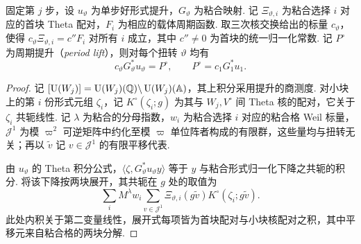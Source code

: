 \begin{lemma}[与扭转无关的周期提升]
\label{lem:c-period-adjoint}
\emitthmsource
固定第 $j$ 步，设 $u_\vartheta$ 为单步好形式提升，$G_\vartheta$ 为粘合映射. 记 $\Xi_{\vartheta,i}$ 为粘合选择 $i$ 对应的首块 Theta 配对，$F_i$ 为相应的载体周期函数. 取三次核交换给出的标量 $c_\vartheta$，使得 $c_\vartheta\Xi_{\vartheta,i}=c''F_i$ 对所有 $i$ 成立，其中 $c''\ne0$ 为首块的统一归一化常数. 记 $P^\circ$ 为周期提升（\emph{period lift}），则对每个扭转 $\vartheta$ 均有
\[
 c_\vartheta G_\vartheta^*u_\vartheta=P^\circ,
 \qquad P^\circ=c_1G_1^*u_1 .
\]
\end{lemma}

\begin{proof}
记 $[\operatorname{U}(W_j)]=\operatorname{U}(W_j)(\mathbb Q)\backslash \operatorname{U}(W_j)(\mathbb A)$，其上积分采用提升的商测度. 对小块上的第 $i$ 份形式元组 $\zeta_i$，记 $K^\circ(\zeta_i;g)$ 为其与 $W_j,V^\circ$ 间 Theta 核的配对，它关于 $\zeta_i$ 共轭线性. 记 $\lambda$ 为粘合的分母指数，$w_i$ 为粘合选择 $i$ 对应的粘合格 Weil 标量，$\mathcal J^1$ 为模 $\varpi^2$ 可逆矩阵中约化至模 $\varpi$ 单位阵者构成的有限群，这些量均与扭转无关；再以 $\widetilde v$ 记 $v\in\mathcal J^1$ 的有限平移代表.

由 $u_\vartheta$ 的 Theta 积分公式，$\langle\zeta,G_\vartheta^*u_\vartheta y\rangle$ 等于 $y$ 与粘合形式归一化下降之共轭的积分. 将该下降按两块展开，其共轭在 $g$ 处的取值为
\[
 \sum_i M^\lambda w_i\sum_{v\in\mathcal J^1}
 \Xi_{\vartheta,i}(g\widetilde v)
 K^\circ(\zeta_i;g\widetilde v).
\]
此处内积关于第二变量线性，展开式每项皆为首块配对与小块核配对之积，其中平移元来自粘合格的两块分解.


\end{proof}
